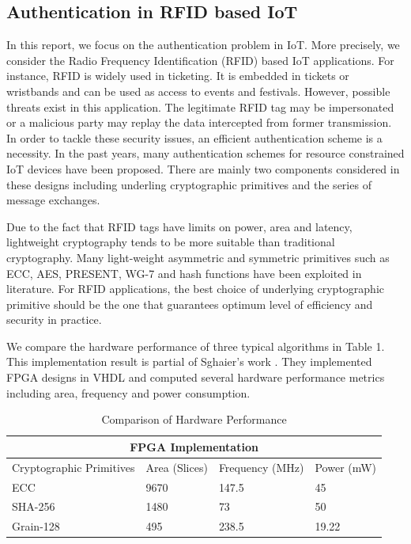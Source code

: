\documentclass[preprint,10pt,5p]{elsarticle}
\begin{document}
\subsection{Authentication in RFID based IoT}
\noindent In this report, we focus on the authentication problem in IoT. More precisely, we consider the Radio Frequency Identification (RFID) based IoT applications. For instance, RFID is widely used in ticketing. It is embedded in tickets or wristbands and can be used as access to events and festivals. However, possible threats exist in this application. The legitimate RFID tag may be impersonated or a malicious party may replay the data intercepted from former transmission. In order to tackle these security issues, an efficient authentication scheme is a necessity.  In the past years, many authentication schemes for resource constrained IoT devices have been proposed. There are mainly two components considered in these designs including underling cryptographic primitives and the series of message exchanges. 

Due to the fact that RFID tags have limits on power, area and latency, lightweight cryptography tends to be more suitable than traditional cryptography. Many light-weight asymmetric and symmetric primitives such as ECC, AES, PRESENT, WG-7 and hash functions have been exploited in literature. For RFID applications, the best choice of underlying cryptographic primitive should be the one that guarantees optimum level of efficiency and security in practice.

We compare the hardware performance of three typical algorithms in Table 1. This implementation result is partial of Sghaier’s work \cite{sghaier2017}. They implemented FPGA designs in VHDL and computed several hardware performance metrics including area, frequency and power consumption. 

\begin{table}[ht]
\centering
\caption{Comparison of Hardware Performance}
\label{Table.1}
\begin{tabular}{ |p{2.5cm}|p{1cm}|p{1.5cm}|p{1cm}|  }
 \hline
 \multicolumn{4}{|c|}{FPGA Implementation} \\
 \hline
 Cryptographic Primitives & Area (Slices) & Frequency (MHz) & Power (mW)\\[0.5ex] 
 \hline 
 ECC   & 9670    &147.5&   45\\
 SHA-256 &   1480  & 73   &50\\
 Grain-128 &495 & 238.5&  19.22\\
 \hline
\end{tabular}
\end{table}
\end{document}
